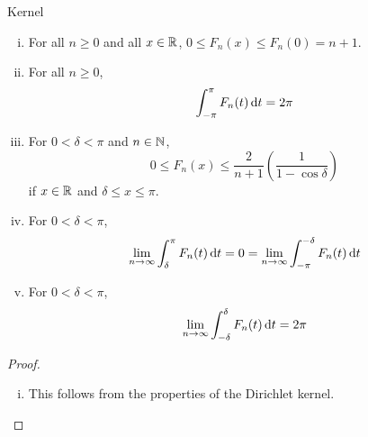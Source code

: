 \begin{section}{\fejers Kernel}
\begin{thrm}
\begin{enumerate}[i)]
		\item
			For all $n \geq 0$ and all $\isreal$, $0 \leq F_n(x)
			\leq F_n(0) = n+1$.
			
		\item
			For all $n \geq 0$,
				\begin{displaymath}
					\myintb[\pi]{F_n(t)}{t} = 2\pi
				\end{displaymath}
				
		\item
			For $0 < \delta < \pi$ and $\isnatrl$,
				\begin{displaymath}
					0 \leq F_n(x) \leq \frac{2}{n+1}\left(
						\frac{1}{1-\cos \delta}\right)
				\end{displaymath}
			if $\isreal$ and $\delta \leq x \leq \pi$.
			
		\item
			For $0 < \delta < \pi$,
				\begin{displaymath}
					\lim_{n \rightarrow \infty}
						\myinta{\delta}{\pi}{F_n(t)}{t} = 0
						= \lim_{n \rightarrow \infty}
						\myinta{-\pi}{-\delta}{F_n(t)}{t}
				\end{displaymath}
				
		\item
			For $0 < \delta < \pi$,
				\begin{displaymath}
					\lim_{n \rightarrow \infty}
						\myintb[\delta]{F_n(t)}{t} = 2\pi
				\end{displaymath}
	
	\end{enumerate}
\end{thrm}

\begin{proof}
	\begin{enumerate}[i)]
		
		\item
			This follows from the properties of the Dirichlet kernel.
		

\end{enumerate}
\end{proof}
\end{section}
